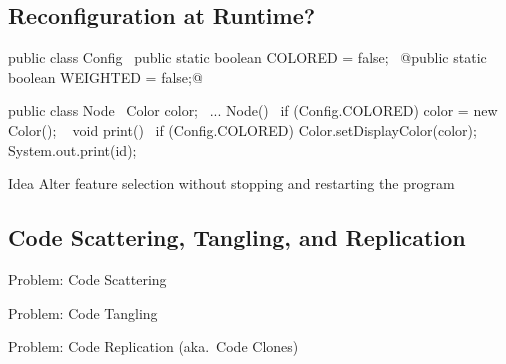 \subsection{Reconfiguration at Runtime?}
\begin{frame}[fragile]{\myframetitle}
	\begin{mycolumns}
\begin{tiny}
\begin{codetight}{}
public class Config {
	~public static boolean COLORED = false;~
	@public static boolean WEIGHTED = false;@
}

\end{codetight}
\begin{codetight}{}
public class Node {
	~Color color;~
	...
	Node(){
		~if (Config.COLORED) {
			color = new Color();
		}~
	}
	void print() {
		~if (Config.COLORED) {
			Color.setDisplayColor(color);
		}~
		System.out.print(id);
	}
}
\end{codetight}
\end{tiny}	
	\mynextcolumn
		\begin{definition}{Idea}
			Alter feature selection without stopping and restarting the program
		\end{definition}
	\end{mycolumns}
\end{frame}


\subsection{Code Scattering, Tangling, and Replication}
\begin{frame}{Problem: Code Scattering }
	\centering{}
\end{frame}

\begin{frame}{Problem: Code Tangling }
	\centering{}
\end{frame}

\begin{frame}{Problem: Code Replication (aka.\ Code Clones)}
	\centering{}
\end{frame}
